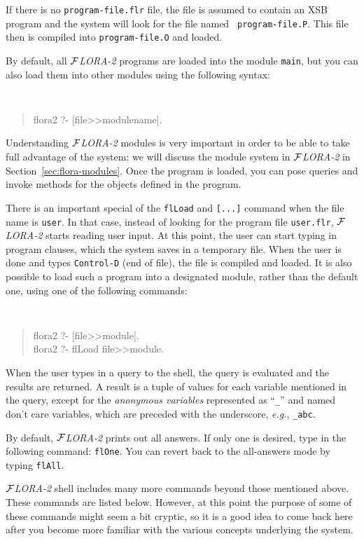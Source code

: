 \documentclass[11pt]{article}
\newcommand{\FLORA}{{\mbox{${\cal F}${\small\it LORA}\rm\emph{-2}}}\xspace}
\begin{document}
If there is no {\tt program-file.flr} file, the file is assumed to contain
an XSB program and the system will look for the file named {\tt
  program-file.P}. This file then is compiled into {\tt program-file.O} and
loaded.

By default, all \FLORA programs are loaded into the module {\tt main}, but
you can also load them into other modules using the following syntax:
{\tt
\begin{quote}
 flora2 ?-  [file>>modulename].
\end{quote}
}
Understanding \FLORA modules is very important in order to be able to take
full advantage of the system; we will discuss the module system in \FLORA
in Section~\ref{sec:flora-modules}.  Once the program is loaded, you can
pose queries and invoke methods for the objects defined in the program.

There is an important special of the {\tt flLoad} and {\tt [...]} command
when the file name is {\tt user}. In that case, instead of looking for the
program file {\tt user.flr}, \FLORA starts reading user input. At this
point, the user can start typing in program clauses, which the system saves
in a temporary file. When the user is done and types {\tt Control-D} (end
of file), the file is compiled and loaded. It is also possible to load such
a program into a designated module, rather than the default one,
using one of the following commands:
{\tt
\begin{quote}
  flora2 ?- [file>>module].\\
  flora2 ?- flLoad file>>module.
\end{quote}
}

When the user types in a query to the shell, the query is evaluated and the
results are returned. A result is a tuple of values for each variable
mentioned in the query, except for the \emph{anonymous variables}
represented as ``{\tt \_}'' and named {\rm don't care variables}, which are
preceded with the underscore, {\it e.g.}, {\tt \_abc}.

By default, \FLORA prints out all answers. If only one is desired, type in
the following command: {\tt flOne}. You can revert back to the all-answers
mode by typing {\tt flAll}.

\FLORA shell includes many more commands beyond those mentioned above.
These commands are listed below. However, at this point the purpose of some
of these commands might seem a bit cryptic, so it is a good idea to come
back here after you become more familiar with the various concepts
underlying the system.
\end{document}
